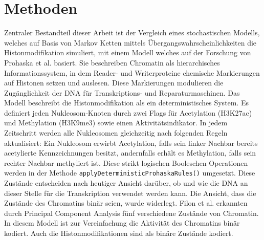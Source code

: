 \documentclass{SeminarV2}
\begin{document}
\section{Methoden}
Zentraler Bestandteil dieser Arbeit ist der Vergleich eines stochastischen Modells, welches auf Basis von Markov Ketten mittels \"{U}bergangswahrscheinlichkeiten die Histonmodifikation simuliert, mit einem Modell welches auf der Forschung von
Prohaska et al. basiert.
Sie beschreiben Chromatin als hierarchisches Informationssystem, in dem Reader- und Writerproteine chemische Markierungen auf Histonen setzen und auslesen. 
Diese Markierungen modulieren die Zugänglichkeit der DNA für Transkriptions- und Reparaturmaschinen.
Das Modell beschreibt die Histonmodifikation als ein deterministisches System.
Es definiert jeden Nukleosom‑Knoten durch zwei Flags für Acetylation (H3K27ac) und Methylation (H3K9me3) sowie einen Aktivitätsindikator. In jedem Zeitschritt werden alle Nukleosomen gleichzeitig nach folgenden Regeln aktualisiert: 
Ein Nukleosom erwirbt Acetylation, falls sein linker Nachbar bereits acetylierte Kennzeichnungen besitzt, andernfalls erhält es Methylation, falls sein rechter Nachbar methy­liert ist. Diese strikt logischen Booleschen Operationen werden in der Methode \texttt{applyDeterministicProhaskaRules()} umgesetzt.
Diese Zustände entscheiden nach heutiger Ansicht darüber, ob und wie die DNA an dieser Stelle für die Transkription verwendet werden kann.
Die Ansicht, dass die Zustände des Chromatins binär seien, wurde widerlegt. Filon et al. erkannten durch Principal Component Analysis fünf verschiedene 
Zustände von Chromatin. \cite{filion-2010} In diesem Modell ist zur Vereinfachung die Aktivität des Chromatins binär kodiert.
Auch die Histonmodifikationen sind als binäre Zustände kodiert. 
\end{document}
